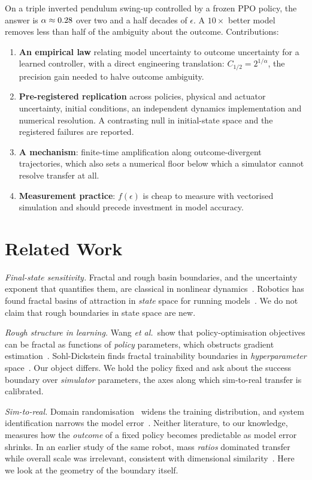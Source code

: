 \documentclass[conference]{IEEEtran}
\begin{document}
On a triple inverted pendulum swing-up controlled by a frozen PPO policy, the answer is
$\alpha\approx0.28$ over two and a half decades of $\epsilon$. A $10\times$ better model removes
less than half of the ambiguity about the outcome. Contributions:
\begin{enumerate}
\item \textbf{An empirical law} relating model uncertainty to outcome uncertainty for a
learned controller, with a direct engineering translation: $C_{1/2}=2^{1/\alpha}$, the precision
gain needed to halve outcome ambiguity.
\item \textbf{Pre-registered replication} across policies, physical and actuator uncertainty,
initial conditions, an independent dynamics implementation and numerical resolution. A contrasting
null in initial-state space and the registered failures are reported.
\item \textbf{A mechanism}: finite-time amplification along outcome-divergent trajectories, which
also sets a numerical floor below which a simulator cannot resolve transfer at all.
\item \textbf{Measurement practice}: $f(\epsilon)$ is cheap to measure with vectorised simulation and
should precede investment in model accuracy.
\end{enumerate}

\section{Related Work}
\emph{Final-state sensitivity.} Fractal and rough basin boundaries, and the uncertainty exponent
that quantifies them, are classical in nonlinear dynamics~\cite{grebogi1983,mcdonald1985}.
Robotics has found fractal basins of attraction in \emph{state} space for running
models~\cite{cnops2015}. We do not claim that rough boundaries in state space are new.

\emph{Rough structure in learning.} Wang \emph{et al.}\ show that policy-optimisation objectives can be
fractal as functions of \emph{policy} parameters, which obstructs gradient
estimation~\cite{wang2023}. Sohl-Dickstein finds fractal trainability boundaries in
\emph{hyperparameter} space~\cite{sohldickstein2024}. Our object differs. We hold the policy fixed and ask
about the success boundary over \emph{simulator} parameters, the axes along which sim-to-real transfer
is calibrated.

\emph{Sim-to-real.} Domain randomisation~\cite{tobin2017,peng2018} widens the training distribution, and
system identification narrows the model error~\cite{gautier1990}. Neither literature, to our knowledge,
measures how the \emph{outcome} of a fixed policy becomes predictable as model error shrinks. In an
earlier study of the same robot, mass \emph{ratios} dominated transfer while overall scale was irrelevant,
consistent with dimensional similarity~\cite{girard2024,pascoa2025}. Here we look at the geometry of the
boundary itself.
\end{document}
